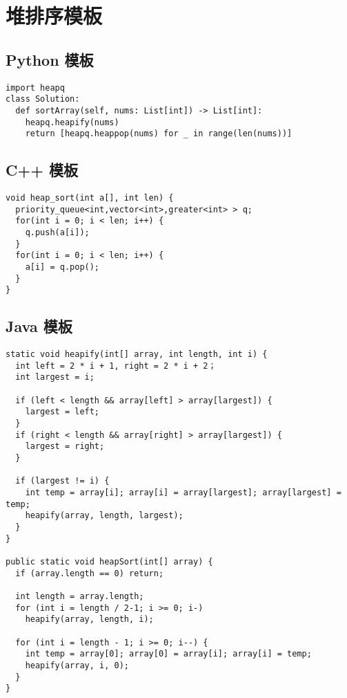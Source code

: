 \newpage
\section{堆排序模板}

\subsection{Python 模板}

\begin{verbatim}
import heapq
class Solution:
  def sortArray(self, nums: List[int]) -> List[int]:
    heapq.heapify(nums)
    return [heapq.heappop(nums) for _ in range(len(nums))]
\end{verbatim}

\subsection{C++ 模板}

\begin{verbatim}
void heap_sort(int a[], int len) {
  priority_queue<int,vector<int>,greater<int> > q;
  for(int i = 0; i < len; i++) {
    q.push(a[i]);
  }
  for(int i = 0; i < len; i++) {
    a[i] = q.pop();
  }
}
\end{verbatim}

\subsection{Java 模板}

\begin{verbatim}
static void heapify(int[] array, int length, int i) {
  int left = 2 * i + 1, right = 2 * i + 2；
  int largest = i;

  if (left < length && array[left] > array[largest]) {
    largest = left;
  }
  if (right < length && array[right] > array[largest]) {
    largest = right;
  }

  if (largest != i) {
    int temp = array[i]; array[i] = array[largest]; array[largest] = temp;
    heapify(array, length, largest);
  }
}

public static void heapSort(int[] array) {
  if (array.length == 0) return;

  int length = array.length;
  for (int i = length / 2-1; i >= 0; i-)
    heapify(array, length, i);

  for (int i = length - 1; i >= 0; i--) {
    int temp = array[0]; array[0] = array[i]; array[i] = temp;
    heapify(array, i, 0);
  }
}
\end{verbatim}
